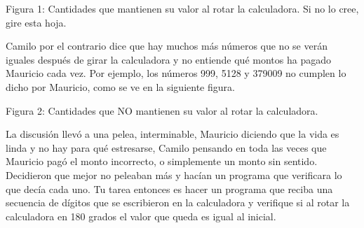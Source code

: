 \documentclass{oci}
\begin{document}
\begin{problemDescription}
\begin{center}
{Figura 1: Cantidades que mantienen su valor al rotar la calculadora. Si no lo cree, gire esta hoja.}
\end{center}

\bigskip
\bigskip


Camilo por el contrario dice que hay muchos más números que no se verán iguales después de girar la calculadora
y no entiende qué montos ha pagado Mauricio cada vez.
Por ejemplo, los números 999, 5128 y 379009 no cumplen lo dicho por Mauricio, como se ve en la siguiente figura.

\bigskip
\bigskip

\begin{center}
\resizebox{!}{40pt}{} \hspace*{50pt}  
\resizebox{!}{40pt}{} \hspace*{50pt}  
\resizebox{!}{40pt}{}\bigskip

{Figura 2: Cantidades que NO mantienen su valor al rotar la calculadora.}
\end{center}

\bigskip
\bigskip


La discusión llevó a una pelea, interminable, Mauricio diciendo que la vida es linda y no hay para qué estresarse, Camilo
pensando en toda las veces que Mauricio pagó el monto incorrecto, o simplemente un monto sin sentido. 
Decidieron que mejor no peleaban más y hacían un programa que verificara lo que decía cada uno.
Tu tarea entonces es hacer un programa que reciba una secuencia de dígitos que se escribieron en la calculadora y 
verifique si al rotar la calculadora en 180 grados el valor que queda es igual al inicial.

  
%

%
%

\end{problemDescription}
\end{document}
